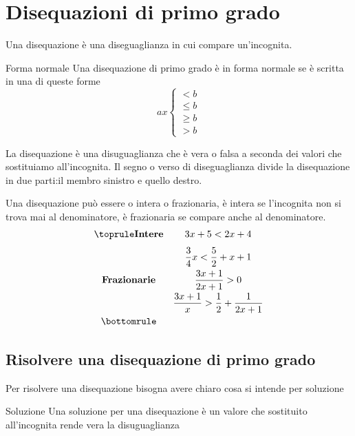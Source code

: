 \section{Disequazioni di primo grado}
\label{sec:Disequuazionidiprimogrado}
\begin{definizionet}{}{}
Una disequazione è una diseguaglianza in cui compare un'incognita.
\end{definizionet}
\begin{definizionet}{Forma normale}{}
	Una disequazione di primo grado è in forma normale se è scritta in una di queste forme
\begin{equation}
ax\left\{ \begin{aligned}
<b\\
\leq b\\
\geq b\\
>b
\end{aligned}\right .   
\end{equation}
\end{definizionet}
La disequazione è una disuguaglianza che è vera o falsa a seconda dei valori che sostituiamo all'incognita.
Il segno o verso di diseguaglianza divide la disequazione in due parti:il membro sinistro e quello destro.\par Una disequazione può essere o intera o frazionaria, è intera se l'incognita non si trova mai al denominatore, è frazionaria se compare anche al denominatore.
\[\centering
\begin{array}{cc}
\toprule
\mathbf{Intere}  & 3x+5<2x+4  \\ [.25cm] 
  &\dfrac{3}{4}x<\dfrac{5}{2}+x+1  \\ [.25cm]
\mathbf{Frazionarie}  &\dfrac{3x+1}{2x+1}>0  \\ [.25cm]
 &\dfrac{3x+1}{x}>\dfrac{1}{2}+\dfrac{1}{2x+1}  \\ [.25cm]
\bottomrule
\end{array} 
\]
\subsection{Risolvere una disequazione di primo grado}
Per risolvere una disequazione bisogna avere chiaro cosa si intende per soluzione
\begin{definizionet}{Soluzione}{}
Una soluzione per una disequazione è un valore che sostituito all'incognita rende vera la disuguaglianza
\end{definizionet}

